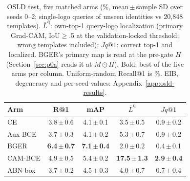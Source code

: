 \begin{table}[t]
\centering\footnotesize\setlength{\tabcolsep}{3pt}
\caption{OSLD test, five matched arms (\%, mean\,$\pm$\,sample SD over seeds 0--2; \osNQueries{} single-logo queries of \osldTestIds{} unseen identities vs 20,848 templates). $\bar L^{\mathrm q}$: own-top-1 query-logo localization (primary Grad-CAM, IoU$\ge$.5 at the validation-locked threshold; wrong templates included); $Jq@1$: correct top-1 and localized. BGER's primary map is read at the pre-gate $H$ (Section~\ref{sec:p0a} reads it at $M{\odot}H$). Bold: best of the five arms per column. Uniform-random Recall@1 is \osRandRefPct\%. EIB, degeneracy and per-seed values: Appendix~\ref{app:osld-results}.}
\label{tab:osld-main}
\begin{tabular}{lcccc}
\toprule
Arm & R@1 & mAP & $\bar L^{\mathrm q}$ & $Jq@1$\\
\midrule
CE & 3.8\,$\pm$\,0.6 & 4.1\,$\pm$\,0.1 & 3.5\,$\pm$\,0.5 & 0.9\,$\pm$\,0.2\\
Aux-BCE & 3.7\,$\pm$\,0.3 & 4.1\,$\pm$\,0.2 & 5.3\,$\pm$\,0.7 & 0.9\,$\pm$\,0.2\\
BGER & \textbf{6.4\,$\pm$\,0.7} & \textbf{7.1\,$\pm$\,0.4} & 2.0\,$\pm$\,0.2 & 0.4\,$\pm$\,0.1\\
CAM-BCE & 4.9\,$\pm$\,0.5 & 5.4\,$\pm$\,0.2 & \textbf{17.5\,$\pm$\,1.3} & \textbf{2.9\,$\pm$\,0.4}\\
ABN-box & 3.7\,$\pm$\,0.2 & 4.5\,$\pm$\,0.3 & 4.0\,$\pm$\,0.7 & 0.7\,$\pm$\,0.4\\
\bottomrule
\end{tabular}
\end{table}
